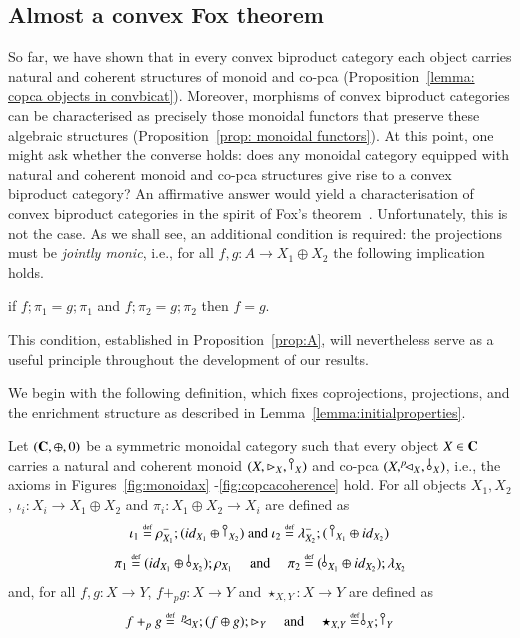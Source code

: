 \subsection{Almost a convex Fox theorem}\label{ssec:almost}
So far, we have shown that in every convex biproduct category each object carries natural and coherent structures of monoid and co-pca (Proposition~\ref{lemma: copca objects in convbicat}). Moreover, morphisms of convex biproduct categories can be characterised as precisely those monoidal functors that preserve these algebraic structures (Proposition~\ref{prop: monoidal functors}).
At this point, one might ask whether the converse holds: does any monoidal category equipped with natural and coherent monoid and co-pca structures give rise to a convex biproduct category? An affirmative answer would yield a characterisation of convex biproduct categories in the spirit of Fox's theorem~\cite{fox1976coalgebras}.
Unfortunately, this is not the case. As we shall see, an additional condition is required: the projections must be \emph{jointly monic}, i.e., for all $f,g\colon A \to X_1\oplus X_2$ the following implication holds.
\begin{center}
if $f;\pi_1=g;\pi_1$ and $f;\pi_2=g;\pi_2$ then $f=g$.
\end{center}
This condition, established in Proposition~\ref{prop:A}, will nevertheless serve as a useful principle throughout the development of our results.


We begin with the following definition, which fixes coprojections, projections, and the enrichment structure as described in Lemma~\ref{lemma:initialproperties}.
\begin{definition}\label{definition:structural}
Let $(\mathbf{C}, \oplus, 0)$ be a symmetric monoidal category such that every object $X\in\mathbf{C}$ carries a natural and coherent monoid $(X,\codiag{X},\cobang{X})$ and co-pca $(X,\diagp{X},\,\bangp{X})$,  i.e., the axioms in Figures~\ref{fig:monoidax} -\ref{fig:copcacoherence} hold. 
For all objects $X_1,X_2$, $\iota_i\colon X_i \to X_1\oplus X_2$ and $\pi_i\colon X_1\oplus X_2 \to X_i$ are defined as
\begin{equation} \iota_1 \defeq \Irunit{X_1};(\id{X_1}\oplus \cobang{X_2})\text{ and } \iota_2 \defeq \Ilunit{X_2};(\,\cobang{X_1}\oplus \id{X_2})\end{equation}
\begin{equation}\label{eq:defpi}\pi_1 \defeq (\id{X_1}\oplus \bang{X_2});\runit{X_1} \quad \text{ and } \quad \pi_2 \defeq (\bang{X_1}\oplus \id{X_2});\lunit{X_2}\end{equation}
and, for all $f,g\colon X\to Y$,  $f +_p g\colon X \to Y$ and $\star_{X,Y}\colon X \to Y$ are defined as
\begin{equation}\label{eq:enrichment} f +_p g \defeq\, \diagp{X};(f \oplus g);\codiag{Y} \quad \text{ and } \quad \star_{X,Y} \defeq \bangp{X};\cobang{Y} \end{equation}
\end{definition}

